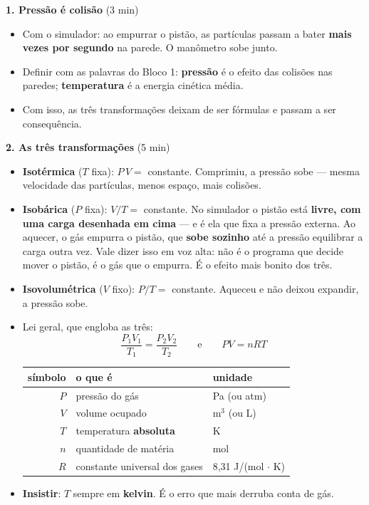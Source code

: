 \documentclass[11pt,a4paper]{article}
\makeatletter
\newcommand{\variaveis}[1]{%
  \begingroup\footnotesize
  \setlength{\tabcolsep}{6pt}
  \renewcommand{\arraystretch}{1.15}
  \begin{center}
  \begin{tabular}{@{}rll@{}}
    \toprule
    \textbf{s\'imbolo} & \textbf{o que \'e} & \textbf{unidade} \\
    \midrule
    #1
    \bottomrule
  \end{tabular}
  \end{center}
  \endgroup}
\makeatother
\begin{document}
\begin{quadro}
\textbf{1. Press\~ao \'e colis\~ao} (3 min)
\begin{itemize}[nosep]
  \item Com o simulador: ao empurrar o pist\~ao, as part\'iculas passam a
        bater \textbf{mais vezes por segundo} na parede. O man\^ometro
        sobe junto.
  \item Definir com as palavras do Bloco 1: \textbf{press\~ao} \'e o efeito
        das colis\~oes nas paredes; \textbf{temperatura} \'e a energia
        cin\'etica m\'edia.
  \item Com isso, as tr\^es transforma\c{c}\~oes deixam de ser f\'ormulas e
        passam a ser consequ\^encia.
\end{itemize}

\medskip
\textbf{2. As tr\^es transforma\c{c}\~oes} (5 min)
\begin{itemize}[nosep]
  \item \textbf{Isot\'ermica} ($T$ fixa): $P\,V = $ constante. Comprimiu,
        a press\~ao sobe --- mesma velocidade das part\'iculas, menos espa\c{c}o,
        mais colis\~oes.
  \item \textbf{Isob\'arica} ($P$ fixa): $V/T = $ constante. No simulador o
        pist\~ao est\'a \textbf{livre, com uma carga desenhada em cima} ---
        e \'e ela que fixa a press\~ao externa. Ao aquecer, o g\'as empurra o
        pist\~ao, que \textbf{sobe sozinho} at\'e a press\~ao equilibrar a
        carga outra vez. Vale dizer isso em voz alta: n\~ao \'e o programa
        que decide mover o pist\~ao, \'e o g\'as que o empurra.
        \'E o efeito mais bonito dos tr\^es.
  \item \textbf{Isovolum\'etrica} ($V$ fixo): $P/T = $ constante. Aqueceu
        e n\~ao deixou expandir, a press\~ao sobe.
  \item Lei geral, que engloba as tr\^es:
  \[
    \boxed{\frac{P_1 V_1}{T_1} = \frac{P_2 V_2}{T_2}}
    \qquad\text{e}\qquad
    \boxed{P V = n R T}
  \]
  \variaveis{
    $P$ & press\~ao do g\'as        & Pa (ou atm) \\
    $V$ & volume ocupado            & m$^3$ (ou L) \\
    $T$ & temperatura \textbf{absoluta} & K \\
    $n$ & quantidade de mat\'eria   & mol \\
    $R$ & constante universal dos gases & 8,31 J/(mol$\,\cdot\,$K) \\
  }
  \item \textbf{Insistir}: $T$ sempre em \textbf{kelvin}. \'E o erro que
        mais derruba conta de g\'as.
\end{itemize}


\end{quadro}
\end{document}

